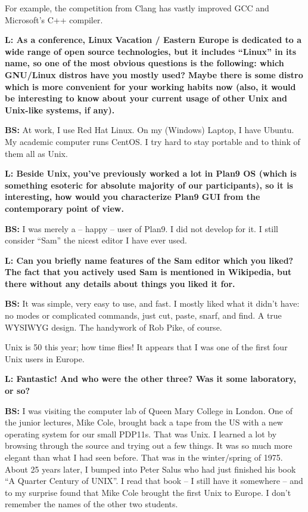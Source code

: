 \documentclass[10pt, a5paper]{article}
\begin{document}
\begin{Parallel}[p]{}{}
{For example, the competition from Clang has vastly improved GCC and Microsoft’s C++ compiler. 

{\noindent \bf L: As a conference, Linux Vacation / Eastern Europe is dedicated to a wide range of open source technologies, but it includes ``Linux'' in its name, so one of the most obvious questions is the following: which GNU/Linux distros have you mostly used? Maybe there is some distro which is more convenient for your working habits now (also, it would be interesting to know about your current usage of other Unix and Unix-like systems, if any). }

{\noindent \bf BS:} At work, I use Red Hat Linux. On my (Windows) Laptop, I have Ubuntu. My academic computer runs CentOS. I try hard to stay portable and to think of them all as Unix.

{\noindent \bf L: Beside Unix, you've previously worked a lot in Plan9 OS (which is something esoteric for absolute majority of our participants), so it is interesting, how would you characterize Plan9 GUI from the contemporary point of view.}

{\noindent \bf BS:} I was merely a – happy – user of Plan9. I did not develop for it. I still consider “Sam” the nicest editor I have ever used.

{\noindent \bf L: Can you briefly name features of the Sam editor which you liked? The fact that you actively used Sam is mentioned in Wikipedia, but there without any details about things you liked it for.}

{\noindent \bf BS:} It was simple, very easy to use, and fast. I mostly liked what it didn’t have: no modes or complicated commands, just cut, paste, snarf, and find. A true WYSIWYG design. The handywork of Rob Pike, of course.

Unix is 50 this year; how time flies! It appears that I was one of the first four Unix users in Europe.
 
{\noindent \bf L: Fantastic! And who were the other three? Was it some laboratory, or so? }

{\noindent \bf BS:} I was visiting the computer lab of Queen Mary College in London. One of the junior lectures, Mike Cole, brought back a tape from the US with a new operating system for our small PDP11s. That was Unix. I learned a lot by browsing through the source and trying out a few things. It was so much more elegant than what I had seen before. That was in the winter/spring of 1975. About 25 years later, I bumped into Peter Salus who had just finished his book “A Quarter Century of UNIX”. I read that book – I still have it somewhere – and to my surprise found that Mike Cole brought the first Unix to Europe. I don’t remember the names of the other two students.
 
}
\end{Parallel}
\end{document}
